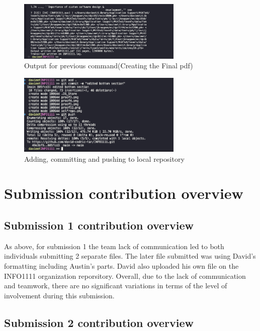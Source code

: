 \documentclass[a4paper, 11pt]{report}
\begin{document}
\begin{figure}[H]
    \centering
    \includegraphics[width=0.7\textwidth]{proof52}
    \caption{Output for previous command(Creating the Final pdf)}
\end{figure}

\begin{figure}[H]
    \centering
    \includegraphics[width=0.7\textwidth]{proof6}
    \caption{Adding, committing and pushing to local repository}
\end{figure}


\newpage
\section{Submission contribution overview}

\subsection{Submission 1 contribution overview}

As above, for submission 1 the team lack of communication led to both individuals submitting 2 separate files. The later file submitted was using David's formatting including Austin's parts. David also uploaded his own file on the INFO1111 organization reporsitory. Overall, due to the lack of communication and teamwork, there are no significant variations in terms of the level of involvement during this submission. 
\subsection{Submission 2 contribution overview}
\end{document}
